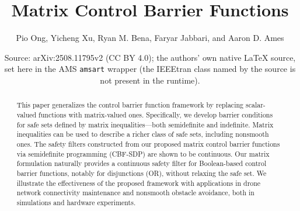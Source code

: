 \documentclass[10pt,a4paper]{amsart}
\title{Matrix Control Barrier Functions}
\author{Pio Ong, Yicheng Xu, Ryan M. Bena, Faryar Jabbari, and Aaron D. Ames}
\date{Source: arXiv:2508.11795v2 (CC BY 4.0); the authors' own native \LaTeX{} source, set here in the AMS \texttt{amsart} wrapper (the IEEEtran class named by the source is not present in the runtime).}
\theoremstyle{definition}
\begin{document}
\maketitle

\maketitle
\begin{abstract}
    This paper generalizes the control barrier function framework by replacing scalar-valued functions with matrix-valued ones. Specifically, we develop barrier conditions for safe sets defined by matrix inequalities---both semidefinite and indefinite. Matrix inequalities can be used to describe a richer class of safe sets, including nonsmooth ones.   The safety filters constructed from our proposed matrix control barrier functions via semidefinite programming (CBF-SDP) are shown to be continuous. Our matrix formulation naturally provides a continuous safety filter for Boolean-based control barrier functions, notably for disjunctions (OR), without relaxing the safe set. We illustrate the effectiveness of the proposed framework with applications in drone network connectivity maintenance and nonsmooth obstacle avoidance, both in simulations and hardware experiments.
\end{abstract}
\end{document}
